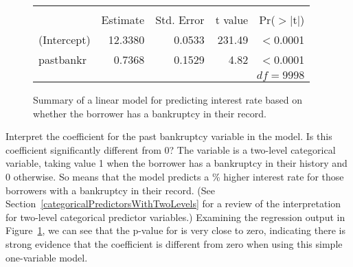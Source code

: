 \begin{figure}[h]
\centering
\begin{tabular}{l rrr r}
  \hline
  \vspace{-3.7mm} & & & & \\
  & Estimate & Std. Error & t value & Pr($>$$|$t$|$) \\ 
  \hline
  (Intercept) & 12.3380 & 0.0533 & 231.49 & $<$0.0001 \\ 
  past\us{}bankr & 0.7368 & 0.1529 & 4.82 & $<$0.0001 \\ 
  \hline
  &&&\multicolumn{2}{r}{$df=9998$}
\end{tabular}
\caption{Summary of a linear model for predicting
    interest rate based on whether the borrower has
    a bankruptcy in their record.}
\label{intRateVsPastBankrModel}
\end{figure}



\begin{examplewrap}
\begin{nexample}{Interpret the coefficient for the
     past bankruptcy variable in the model.
     Is this coefficient significantly different from 0?}
  The  variable is a two-level categorical
  variable, taking value 1 when the borrower has a bankruptcy
  in their history and 0 otherwise.
  So \pastbankrACoef{} means that the model predicts a
  \pastbankrACoef{}\% higher
  interest rate for those borrowers with a bankruptcy in
  their record.
  (See Section~\ref{categoricalPredictorsWithTwoLevels}
  for a review of the interpretation for two-level
  categorical predictor variables.)
  Examining the regression output in
  Figure~\ref{intRateVsPastBankrModel},
  we can see that the p-value for 
  is very close to zero, indicating there is strong evidence
  that the coefficient is different from zero when using this
  simple one-variable model.
\end{nexample}
\end{examplewrap}

